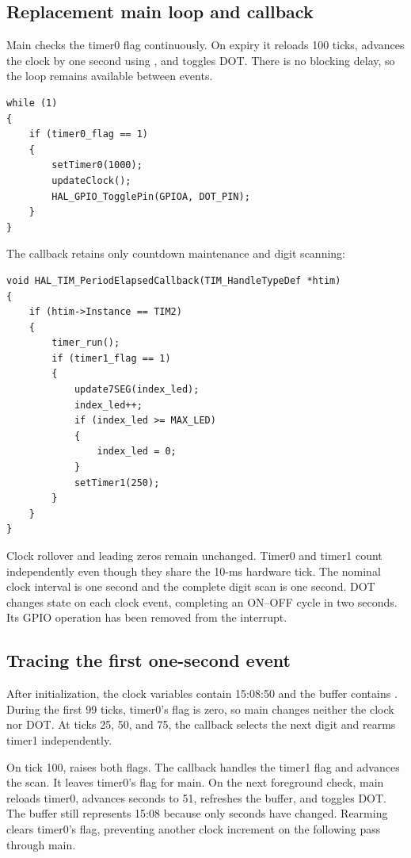 \documentclass[a4paper]{article}
\newcommand{\code}[1]{\texttt{\detokenize{#1}}}
\newcommand{\topic}[1]{\subsection{#1}}
\begin{document}
\topic{Replacement main loop and callback}
Main checks the timer0 flag continuously. On expiry it reloads 100 ticks,
advances the clock by one second using \code{updateClock()}, and toggles DOT.
There is no blocking delay, so the loop remains available between events.
\par\noindent\begin{minipage}{\linewidth}
\begin{lstlisting}[caption={Exercise 7 main loop}]
while (1)
{
    if (timer0_flag == 1)
    {
        setTimer0(1000);
        updateClock();
        HAL_GPIO_TogglePin(GPIOA, DOT_PIN);
    }
}
\end{lstlisting}
\end{minipage}\par
The callback retains only countdown maintenance and digit scanning:
\par\noindent\begin{minipage}{\linewidth}
\begin{lstlisting}[caption={Exercise 7 callback with digit scanning}]
void HAL_TIM_PeriodElapsedCallback(TIM_HandleTypeDef *htim)
{
    if (htim->Instance == TIM2)
    {
        timer_run();
        if (timer1_flag == 1)
        {
            update7SEG(index_led);
            index_led++;
            if (index_led >= MAX_LED)
            {
                index_led = 0;
            }
            setTimer1(250);
        }
    }
}
\end{lstlisting}
\end{minipage}\par
Clock rollover and leading zeros remain unchanged. Timer0 and timer1 count
independently even though they share the 10-ms hardware tick. The nominal
clock interval is one second and the complete digit scan is one second.
DOT changes state on each clock event, completing an ON--OFF cycle in two
seconds. Its GPIO operation has been removed from the interrupt.

\topic{Tracing the first one-second event}
After initialization, the clock variables contain 15:08:50 and the buffer
contains \code{{1, 5, 0, 8}}. During the first 99 ticks, timer0's flag is
zero, so main changes neither the clock nor DOT. At ticks 25, 50, and 75,
the callback selects the next digit and rearms timer1 independently.

On tick 100, \code{timer_run()} raises both flags. The callback handles the
timer1 flag and advances the scan. It leaves timer0's flag for main. On the
next foreground check, main reloads timer0, advances seconds to 51, refreshes
the buffer, and toggles DOT. The buffer still represents 15:08 because only
seconds have changed. Rearming clears timer0's flag, preventing another clock
increment on the following pass through main.
\end{document}
